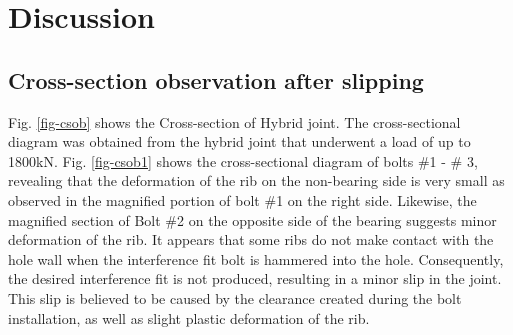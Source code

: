 \section{Discussion}

\subsection{Cross-section observation after slipping}

Fig. \ref{fig-csob} shows the Cross-section of Hybrid joint. The cross-sectional diagram was obtained from the hybrid joint that underwent a load of up to 1800kN. Fig. \ref{fig-csob1} shows the cross-sectional diagram of bolts \#1 - \# 3, revealing that the deformation of the rib on the non-bearing side is very small as observed in the magnified portion of bolt \#1 on the right side. Likewise, the magnified section of Bolt \#2 on the opposite side of the bearing suggests minor deformation of the rib. It appears that some ribs do not make contact with the hole wall when the interference fit bolt is hammered into the hole. Consequently, the desired interference fit is not produced, resulting in a minor slip in the joint. This slip is believed to be caused by the clearance created during the bolt installation, as well as slight plastic deformation of the rib.

